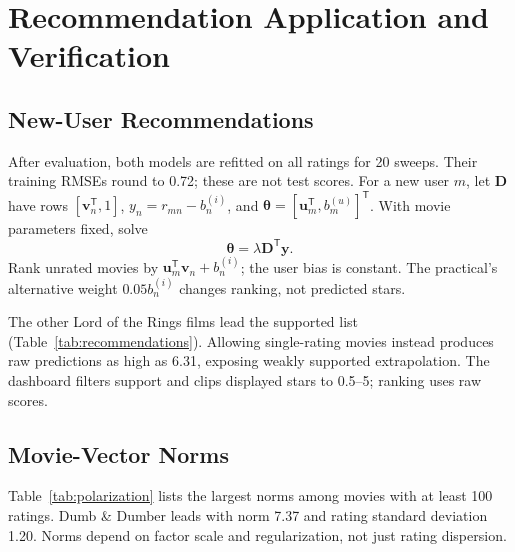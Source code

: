 \section{Recommendation Application and Verification}
\subsection{New-User Recommendations}
After evaluation, both models are refitted on all ratings for 20 sweeps. Their training RMSEs round to 0.72; these are not test scores. For a new user $m$, let $\mathbf D$ have rows $[\mathbf v_n^{\mathsf T},1]$, $y_n=r_{mn}-b_n^{(i)}$, and $\boldsymbol\theta=[\mathbf u_m^{\mathsf T},b_m^{(u)}]^{\mathsf T}$. With movie parameters fixed, solve
\begin{equation}
[\lambda\mathbf D^{\mathsf T}\mathbf D+\operatorname{diag}(\tau,\ldots,\tau,\tau_b)]\boldsymbol\theta
=\lambda\mathbf D^{\mathsf T}\mathbf y.
\label{eq:new-user}
\end{equation}
Rank unrated movies by $\mathbf u_m^{\mathsf T}\mathbf v_n+b_n^{(i)}$; the user bias is constant. The practical's alternative weight $0.05b_n^{(i)}$ changes ranking, not predicted stars.



The other Lord of the Rings films lead the supported list (Table~\ref{tab:recommendations}). Allowing single-rating movies instead produces raw predictions as high as 6.31, exposing weakly supported extrapolation. The dashboard filters support and clips displayed stars to 0.5--5; ranking uses raw scores.

\begin{table}[H]
\caption{Genre-model recommendations after rating The Fellowship of the Ring five stars; support $\geq100$.}
\label{tab:recommendations}\centering\small
\end{table}

\subsection{Movie-Vector Norms}
Table~\ref{tab:polarization} lists the largest norms among movies with at least 100 ratings. Dumb \& Dumber leads with norm 7.37 and rating standard deviation 1.20. Norms depend on factor scale and regularization, not just rating dispersion.

\begin{table}[H]
\caption{Largest supported movie-vector norms. SD denotes rating standard deviation over all observations.}
\label{tab:polarization}\centering\small\setlength{\tabcolsep}{3pt}
\end{table}



